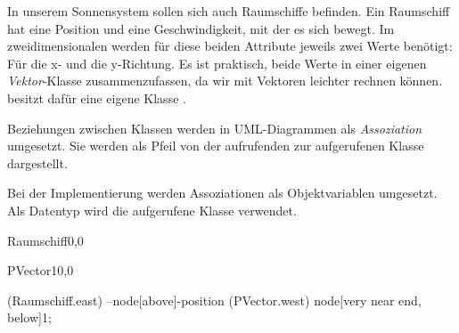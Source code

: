 \documentclass[9pt, a4paper]{arbeitsblatt}
\begin{document}
\ReiheTitel

In unserem Sonnensystem sollen sich auch Raumschiffe befinden. Ein Raumschiff hat eine Position und eine Geschwindigkeit, mit der es sich bewegt. Im zweidimensionalen werden für diese beiden Attribute jeweils zwei Werte benötigt: Für die x- und die y-Richtung. Es ist praktisch, beide Werte in einer eigenen \emph{Vektor}-Klasse zusammenzufassen, da wir mit Vektoren leichter rechnen können.  besitzt dafür eine eigene Klasse .

\begin{infobox}
	Beziehungen zwischen Klassen werden in UML-Diagrammen als \emph{Assoziation} umgesetzt. Sie werden als Pfeil von der aufrufenden zur aufgerufenen Klasse dargestellt.

	Bei der Implementierung werden Assoziationen als Objektvariablen umgesetzt. Als Datentyp wird die aufgerufene Klasse verwendet.
\end{infobox}

\begin{klassendiagramm}
	\begin{class}[text width=8cm]{Raumschiff}{0,0}

	\end{class}

	\begin{class}[text width=6cm]{PVector}{10,0}

	\end{class}

	 (Raumschiff.east) --node[above]{-position} (PVector.west) node[very near end, below]{1};
\end{klassendiagramm}
\end{document}
